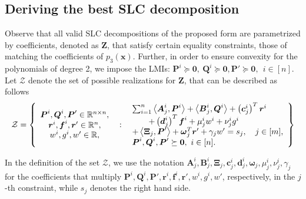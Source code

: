 \documentclass[opre,nonblindrev]{informs3} %
\begin{document}
\subsection{Deriving the best SLC decomposition}
Observe that all valid SLC decompositions of the proposed form are parametrized by coefficients, denoted as 
$\boldsymbol{Z}$, that satisfy certain equality constraints, those of matching the coefficients of $p_3(\boldsymbol{x})$. Further, in order to ensure convexity for the polynomials of degree 2, we impose the LMIs: $ \boldsymbol{P}^i \succeq \boldsymbol{0}, \ \boldsymbol{Q}^i \succeq \boldsymbol{0}, \boldsymbol{P}' \succeq \boldsymbol{0}, \: \: i \in [n].$  Let $\mathcal{Z}$ denote the set of possible realizations for $\boldsymbol{Z}$, that can be described as follows
\begin{equation*}
    \mathcal{Z} = \left\{ \begin{array}{c} 
    \boldsymbol{P}^i, \boldsymbol{Q}^i, \boldsymbol{P}' \in \mathbb{R}^{n \times n}, \\
    \boldsymbol{r}^i, \boldsymbol{f}^i, \boldsymbol{r}' \in \mathbb{R}^n, \\
   w^i, g^i,  w' \in \mathbb{R}, \end{array} \enskip : \enskip  \begin{array}{lr}
	 \sum_{i=1}^n \left \langle \boldsymbol{A}_j^i, \boldsymbol{P}^i \right \rangle + \left \langle \boldsymbol{B}_j^i, \boldsymbol{Q}^i \right \rangle + \left( \boldsymbol{c}_j^i \right)^T \boldsymbol{r}^i \\ 
     \quad \quad + \left( \boldsymbol{d}_j^i \right)^T \boldsymbol{f}^i + \mu_j^i w^i + \nu_j^i g^i \\ 
     + \left \langle \boldsymbol{\Xi}_j, \boldsymbol{P}' \right \rangle + \boldsymbol{\omega}_j^T \boldsymbol{r}' + \gamma_j w' = s_j, \quad j \in [m], \\
    \boldsymbol{P}^i, \boldsymbol{Q}^i, \boldsymbol{P}' \succeq \boldsymbol{0}, \ i \in [n].
	 \end{array}  \right\}
\end{equation*} 

{\color{black} In the definition of the set $\mathcal{Z}$, we use the notation $\boldsymbol{A}_j^i,\boldsymbol{B}_j^i,\boldsymbol{\Xi}_j,\boldsymbol{c}_j^i,\boldsymbol{d}_j^i,\boldsymbol{\omega}_j,\mu_j^i,\nu_j^i,\gamma_j$ for the coefficients that multiply $\boldsymbol{P}^i,\boldsymbol{Q}^i,\boldsymbol{P}',\boldsymbol{r}^i,\boldsymbol{f}^i,\boldsymbol{r}',w^i,g^i,w'$, respectively, in the $j$-th constraint, while $s_j$ denotes the right hand side.}
\end{document}

